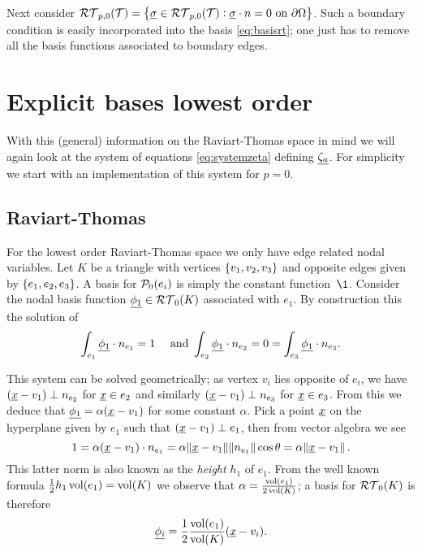 \documentclass[thesis.tex]{subfiles}
\begin{document}
Next consider $\RT_{p,0}( \T) = \set{ \vsig \in \RT_{p,0}( \T) : \vsig \cdot n = 0 \text{ on } \partial  \O}$.
Such a boundary condition is easily incorporated into the basis \eqref{eq:basisrt}; one just has to remove all the basis functions associated
to boundary edges.

\section{Explicit bases lowest order}
With this (general) information on the  Raviart-Thomas space in mind we will again look at the
system of equations \eqref{eq:systemzeta} defining $\vzeta$. For simplicity we start with an
implementation of this system for $p=0$.

\subsection{Raviart-Thomas}
For the lowest order Raviart-Thomas space we only have edge related nodal variables.
Let $K$ be a triangle with vertices $\set{v_1, v_2, v_3}$ and opposite edges given by $\set{e_1, e_2, e_3}$.
A basis for $\P_0(e_i)$ is simply the constant function~$\1$.
Consider the nodal basis function $\v{\phi_1} \in \RT_0(K)$ associated with $e_1$.
By construction this the solution of
\[
  \int_{e_1} \v{\phi_1}\cdot n_{e_1} = 1 \quad \text{ and } \int_{e_2} \v{\phi_1} \cdot n_{e_2} = 0 = \int_{e_3} \v{\phi_1} \cdot n_{e_3}.
\]

This system can be solved geometrically; as vertex $v_i$ lies opposite of $e_i$, we have $(\v{x} - v_1) \perp n_{e_2}$ for $\v{x} \in e_2$ and similarly $(\v{x} - v_1) \perp  n_{e_3}$ for $\v{x} \in e_3$.
From this we deduce that $\v{\phi_1} = \alpha (\v{x} - v_1)$ for some constant $\alpha$. Pick a  point $\v{x}$ on the hyperplane given by $e_1$ such that
$(\v{x} - v_1) \perp e_1$, then from vector algebra we see
\[
  1 = \alpha(\v{x} - v_1)\cdot n_{e_1} = \alpha \norm{\v{x} - v_1}\norm{n_{e_1}} \cos \theta = \alpha \norm{\v{x} - v_1}.
\]
This latter norm is also known as the \emph{height} $h_1$ of $e_1$. From the well known formula $\frac{1}{2} h_1 \vol(e_1) = \vol(K)$
we observe that $\alpha = \frac{\vol(e_1)}{2\vol(K)}$; a  basis for $\RT_0(K)$ is therefore 
\[
  \v{\phi_i} = \frac{1}{2}\frac{\vol(e_1)}{\vol(K)}( \v{x} - v_i).
\]
\end{document}
